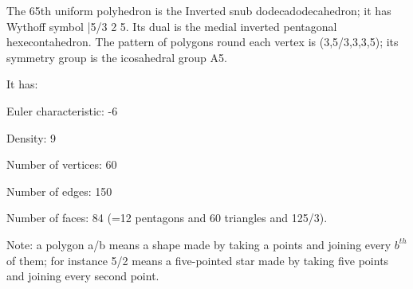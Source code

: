 The 65th uniform polyhedron is the Inverted snub dodecadodecahedron; it has Wythoff symbol |5/3 2 5. Its dual is the medial inverted pentagonal hexecontahedron. The pattern of polygons round each vertex is (3,5/3,3,3,5); its symmetry group is the icosahedral group A5.\par
It has:\par
Euler characteristic: -6\par
Density: 9\par
Number of vertices: 60\par
Number of edges:  150\par
Number of faces: 84 (=12 pentagons and 60 triangles and 12{5/3}).\par
Note: a polygon a/b means a shape made by taking a points and joining every $b^{th}$  of them; for instance 5/2 means a five-pointed star made by taking five points and joining every second point.